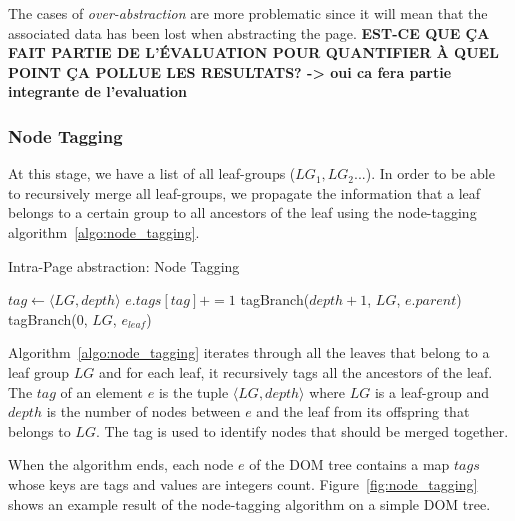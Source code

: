 The cases of \emph{over-abstraction} are more problematic since it will mean that the associated data has been lost when abstracting the page.
\textbf{EST-CE QUE ÇA FAIT PARTIE DE L'ÉVALUATION POUR QUANTIFIER À QUEL POINT ÇA POLLUE LES RESULTATS? -> oui ca fera partie integrante de l'evaluation}

\subsubsection{Node Tagging}
\label{sec:node_tagging}
At this stage, we have a list of all leaf-groups ($LG_1, LG_2...$). 
In order to be able to recursively merge all leaf-groups, we propagate the information that a leaf belongs to a certain group to all ancestors of the leaf using the node-tagging algorithm~\ref{algo:node_tagging}.

\begin{algorithm}
\caption{Intra-Page abstraction: Node Tagging}\label{alg:intra_tagging}
\begin{algorithmic}[1]
      \State $tag \gets \langle LG, depth \rangle$
      \State $e.tags[tag] += 1$ 
      \State tagBranch($depth + 1$, $LG$, $e.parent$)
    \EndFunction
        \State tagBranch(0, $LG$, $e_{leaf}$) 
      \EndFor
    \EndFor
  \EndFunction
\end{algorithmic}
\label{algo:node_tagging}
\end{algorithm}

Algorithm~\ref{algo:node_tagging} iterates through all the leaves that belong to a leaf group $LG$ and for each leaf, it recursively tags all the ancestors of the leaf. 
The $tag$ of an element $e$ is the tuple $\langle LG, depth \rangle$ where $LG$ is a leaf-group and $depth$ is the number of nodes between $e$ and the leaf from its offspring that belongs to $LG$.
The tag is used to identify nodes that should be merged together.

When the algorithm ends, each node $e$ of the DOM tree contains a map $tags$ whose keys are tags and values are integers count. 
Figure~\ref{fig:node_tagging} shows an example result of the node-tagging algorithm on a simple DOM tree. 

